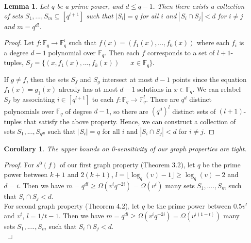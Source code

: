 \documentclass[psamsfonts]{amsart}
\newtheorem{cor}[theorem]{Corollary}
\newtheorem{lem}[theorem]{Lemma}
\theoremstyle{definition}
\theoremstyle{remark}
\numberwithin{equation}{section}
\begin{document}
	\begin{lem}
	Let $q$ be a prime power, and $d \leq  q-1$. Then there exists a collection of sets $S_1, ..., S_m \subseteq [q^{l+1}]$ such that $|S_i| = q$ for all $i$ and $|S_i \cap S_j| < d$ for $i \neq j$ and $m = q^{dl}$.
	\end{lem}
	\begin{proof}
	Let $f : \mathbb{F}_q \rightarrow \mathbb{F}^l_q$ such that $f(x) = (f_1(x), ... ,f_k(x))$ where each $f_i$ is a degree $d-1$ polynomial over $\mathbb{F}_q$. Then each $f$ corresponds to a set of $l+1$-tuples, $S_f = \{(x,f_1(x),...,f_k(x))\text{ }  |\text{ } x \in \mathbb{F}_q\}$. 

If $g \neq f$, then the sets $S_f$ and $S_g$ intersect at most $d-1$ points since the equation $f_1(x) = g_1(x)$ already has at most $d-1$ solutions in $x \in \mathbb{F}_q$. We can relabel $S_f$ by associating $i \in [q^{l+1}]$ to each $f : \mathbb{F}_q \rightarrow \mathbb{F}^l_q$. There are $q^d$ distinct polynomials over $\mathbb{F}_q$ of degree $d-1$, so there are $(q^d)^l$ distinct sets of $(l+1)$-tuples that satisfy the above property. Hence, we can construct a collection of sets $S_1, ..., S_{q^{dl}}$ such that $|S_i| = q$ for all $i$ and $|S_i \cap S_j| < d$ for $i \neq j$.
	\end{proof}
	\begin{cor}
		The upper bounds on 0-sensitivity of our graph properties are tight.
	\end{cor}
	\begin{proof}
		For $s^0(f)$ of our first graph property (Theorem 3.2), let $q$ be the prime power between $k+1$ and $2(k+1)$, $l = \lfloor \log_q(v)-1 \rfloor \geq \log_q(v)-2$ and $d=i$. Then we have $m = q^{dl} \geq \Omega(v^iq^{-2i}) = \Omega(v^i)$ many sets $S_1,....,S_m$ such that $S_i \cap S_j < d$.\\
		\indent For second graph property (Theorem 4.2), let $q$ be the prime power between $0.5v^t$ and $v^t$, $l = 1/t - 1$. Then we have $m = q^{dl} \geq \Omega(v^iq^{-2i}) = \Omega(v^{i(1-t)})$ many sets $S_1,....,S_m$ such that $S_i \cap S_j < d$.\\
	\end{proof}
\end{document}
